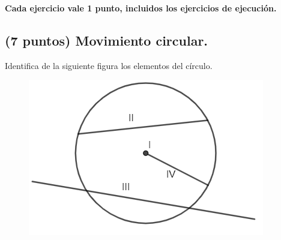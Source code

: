 \documentclass[12pt, letter]{exam}
\begin{document}


\setcounter{page}{3}

\begin{center}
\textbf{Cada ejercicio vale 1 punto, incluidos los ejercicios de ejecución.}
\end{center}

\begin{questions}

    \section{(7 puntos) Movimiento circular.}

    \question Identifica de la siguiente figura los elementos del círculo.
    \begin{figure}[H]
        \centering
        \includegraphics[scale=1]{Elementos_Circulo_01.png}
    \end{figure}
    \begin{multicols}{2}
\end{multicols}
\end{questions}
\end{document}
